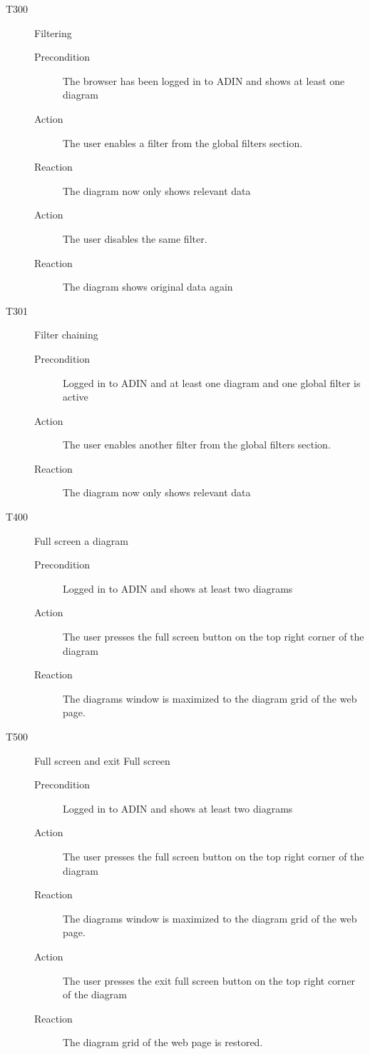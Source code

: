 \documentclass[twoside, english, draft]{Pflichtenheft}
\begin{document}
\begin{description}
  \item[T300] Filtering
\begin{description}
    \item[Precondition]
	The browser has been logged in to ADIN and shows at least one diagram
    \item[Action]
    The user enables a filter from the global filters section.
    \item[Reaction]
	The diagram now only shows relevant data
	\item[Action]
    The user disables the same filter.
    \item[Reaction]
	The diagram shows original data again
\end{description}

  \item[T301] Filter chaining
\begin{description}
    \item[Precondition]
	Logged in to ADIN and at least one diagram and one global filter is active
    \item[Action]
    The user enables another filter from the global filters section.
    \item[Reaction]
	The diagram now only shows relevant data
\end{description}

  \item[T400] Full screen a diagram
\begin{description}
    \item[Precondition]
	Logged in to ADIN and shows at least two diagrams
    \item[Action]
    The user presses the full screen button on the top right corner of the diagram
    \item[Reaction]
	The diagrams window is maximized to the diagram grid of the web page.
\end{description}

  \item[T500] Full screen and exit Full screen
\begin{description}
    \item[Precondition]
	Logged in to ADIN and shows at least two diagrams
    \item[Action]
    The user presses the full screen button on the top right corner of the diagram
    \item[Reaction]
	The diagrams window is maximized to the diagram grid of the web page.
    \item[Action]
    The user presses the exit full screen button on the top right corner of the diagram
    \item[Reaction]
	The diagram grid of the web page is restored.
\end{description}


\end{description}
\end{document}
